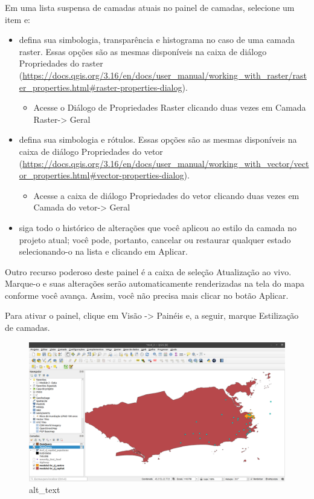 \documentclass[
]{book}
\providecommand{\tightlist}{%
  \setlength{\itemsep}{0pt}\setlength{\parskip}{0pt}}
\begin{document}
Em uma lista suspensa de camadas atuais no painel de camadas, selecione um item e:

\begin{itemize}
\tightlist
\item
  defina sua simbologia, transparência e histograma no caso de uma camada raster. Essas opções são as mesmas disponíveis na caixa de diálogo Propriedades do raster (\url{https://docs.qgis.org/3.16/en/docs/user_manual/working_with_raster/raster_properties.html\#raster-properties-dialog}).

  \begin{itemize}
  \tightlist
  \item
    Acesse o Diálogo de Propriedades Raster clicando duas vezes em Camada Raster-\textgreater{} Geral
  \end{itemize}
\item
  defina sua simbologia e rótulos. Essas opções são as mesmas disponíveis na caixa de diálogo Propriedades do vetor (\href{https://docs.\%20qgis.org/3.16/en/docs/user_manual/working_with_vector/vector_properties.html\#vector-properties-dialog}{https://docs.qgis.org/3.16/en/docs/user\_manual/working\_with\_vector/vector\_properties.html\#vector-properties-dialog}).

  \begin{itemize}
  \tightlist
  \item
    Acesse a caixa de diálogo Propriedades do vetor clicando duas vezes em Camada do vetor-\textgreater{} Geral
  \end{itemize}
\item
  siga todo o histórico de alterações que você aplicou ao estilo da camada no projeto atual; você pode, portanto, cancelar ou restaurar qualquer estado selecionando-o na lista e clicando em Aplicar.
\end{itemize}

Outro recurso poderoso deste painel é a caixa de seleção Atualização ao vivo. Marque-o e suas alterações serão automaticamente renderizadas na tela do mapa conforme você avança. Assim, você não precisa mais clicar no botão Aplicar.

Para ativar o painel, clique em Visão -\textgreater{} Painéis e, a seguir, marque Estilização de camadas.

\begin{figure}
\centering
\includegraphics{media/modulo4/layer-styling.png}
\caption{alt\_text}
\end{figure}
\end{document}
